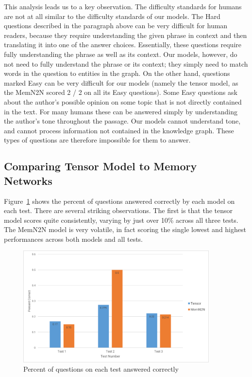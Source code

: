 \documentclass[pageno]{final_paper}
\begin{document}
This analysis leads us to a key observation. The difficulty standards for humans
are not at all similar to the difficulty standards of our models. The Hard
questions described in the paragraph above can be very difficult for human
readers, because they require understanding the given phrase in context and then
translating it into one of the answer choices. Essentially, these questions
require fully understanding the phrase as well as its context. Our models,
however, do not need to fully understand the phrase or its context; they simply
need to match words in the question to entities in the graph. On the other hand,
questions marked Easy can be very difficult for our models (namely the tensor model,
as the MemN2N scored 2 / 2 on all its Easy questions). Some Easy questions ask
about the author's possible opinion on some topic that is not directly contained
in the text. For many humans these can be answered simply by understanding the
author's tone throughout the passage. Our models cannot understand tone, and
cannot process information not contained in the knowledge graph. These types
of questions are therefore impossible for them to answer.

\subsection{Comparing Tensor Model to Memory Networks}
\label{Comparing Tensor Model to Memory Networks}

Figure~\ref{fig: qa_by_test} shows the percent of questions answered correctly
by each model on each test. There are several striking observations. The first
is that the tensor model scores quite consistently, varying by just over 10\%
across all three tests. The MemN2N model is very volatile, in fact scoring the
single lowest and highest performances across both models and all tests.

\begin{figure}[!tb]
    \centering
    \includegraphics[width=0.9\textwidth,keepaspectratio]{figures/qa_by_test.png}
    \caption{Percent of questions on each test answered correctly}
    \label{fig: qa_by_test}
\end{figure}
\end{document}

